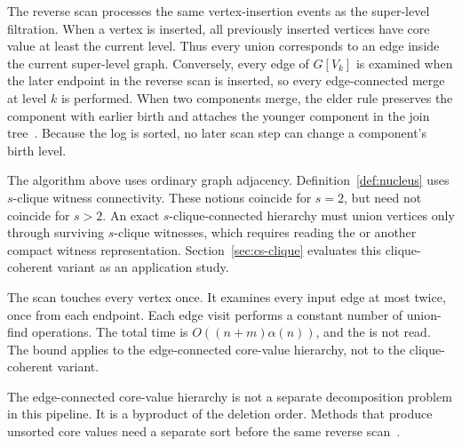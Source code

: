 The reverse scan processes the same vertex-insertion events as the super-level filtration.
%
When a vertex is inserted, all previously inserted vertices have core value at least the current level.
%
Thus every union corresponds to an edge inside the current super-level graph.
%
Conversely, every edge of \(G[V_k]\) is examined when the later endpoint in the reverse scan is inserted, so every edge-connected merge at level \(k\) is performed.
%
When two components merge, the elder rule preserves the component with earlier birth and attaches the younger component in the join tree~\cite{morozov2007persistence}.
%
Because the log is sorted, no later scan step can change a component's birth level.

The algorithm above uses ordinary graph adjacency.
%
Definition~\ref{def:nucleus} uses \(s\)-clique witness connectivity.
%
These notions coincide for \(s=2\), but need not coincide for \(s>2\).
%
An exact \(s\)-clique-connected hierarchy must union vertices only through surviving \(s\)-clique witnesses, which requires reading the \cpi{} or another compact witness representation.
%
Section~\ref{sec:cs-clique} evaluates this clique-coherent variant as an application study.

The scan touches every vertex once.
%
It examines every input edge at most twice, once from each endpoint.
%
Each edge visit performs a constant number of union-find operations.
%
The total time is \(O((n+m)\alpha(n))\), and the \cpi{} is not read.
%
The bound applies to the edge-connected core-value hierarchy, not to the clique-coherent variant.

The edge-connected core-value hierarchy is not a separate decomposition problem in this pipeline.
%
It is a byproduct of the deletion order.
%
Methods that produce unsorted core values need a separate sort before the same reverse scan~\cite{nucleusSariyuce14}.

